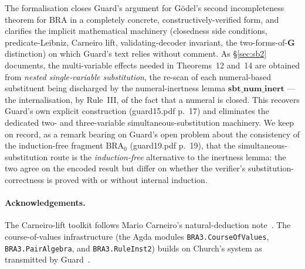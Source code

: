 \documentclass[11pt]{article}
\theoremstyle{plain}
\theoremstyle{definition}
\theoremstyle{remark}
\begin{document}
The formalisation closes Guard's argument for G\"odel's second
incompleteness theorem for BRA in a completely concrete,
constructively-verified form, and clarifies the implicit mathematical
machinery (closedness side conditions, predicate-Leibniz, Carneiro lift,
validating-decoder invariant, the two-forms-of-$\mathbf{G}$ distinction) on
which Guard's text relies without comment.  As {\S}\ref{sec:sb2} documents,
the multi-variable effects needed in Theorems~12 and~14 are obtained from
\emph{nested single-variable substitution}, the re-scan of each
numeral-based substituent being discharged by the numeral-inertness lemma
$\mathbf{sbt\_num\_inert}$ --- the internalisation, by Rule~III, of the fact
that a numeral is closed.  This recovers Guard's own explicit construction
(guard15.pdf p.~17) and eliminates the dedicated two- and three-variable
simultaneous-substitution machinery.  We keep on record, as a remark bearing
on Guard's open problem about the consistency of the induction-free fragment
$\mathrm{BRA}_0$ (guard19.pdf p.~19), that the simultaneous-substitution
route is the \emph{induction-free} alternative to the inertness lemma: the
two agree on the encoded result but differ on whether the verifier's
substitution-correctness is proved with or without internal induction.

\paragraph{Acknowledgements.}  {\sloppy The Carneiro-lift toolkit
follows Mario Carneiro's natural-deduction note~\cite{Carneiro}.  The
course-of-values infrastructure (the Agda modules
\texttt{BRA3.CourseOfValues}, \texttt{BRA3.PairAlgebra}, and
\texttt{BRA3.RuleInst2}) builds on Church's system as transmitted by
Guard~\cite{Guard1963,Church}.\par}
\end{document}
